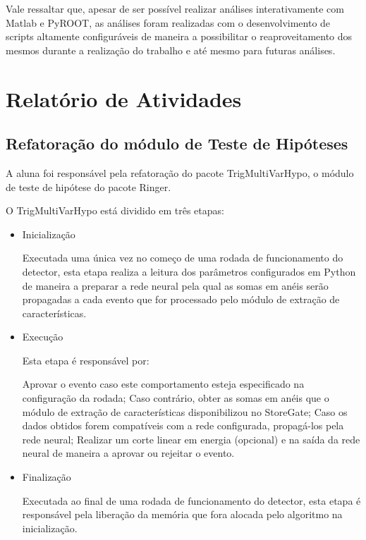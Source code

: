 \documentclass[a4paper,10pt,titlepage]{article}
\begin{document}
Vale ressaltar que, apesar de ser possível realizar análises interativamente com Matlab e PyROOT, as análises foram realizadas com o desenvolvimento de scripts altamente configuráveis de maneira a possibilitar o reaproveitamento dos mesmos durante a realização do trabalho e até mesmo para futuras análises.

\clearpage

\section{Relatório de Atividades}

\subsection{Refatoração do módulo de Teste de Hipóteses}

A aluna foi responsável pela refatoração do pacote TrigMultiVarHypo, o módulo de teste de hipótese do pacote Ringer.

O TrigMultiVarHypo está dividido em três etapas:

\begin{itemize}
 \item Inicialização

Executada uma única vez no começo de uma rodada de funcionamento do detector, esta etapa realiza a leitura dos parâmetros configurados em Python de maneira a preparar a rede neural pela qual as somas em anéis serão propagadas a cada evento que for processado pelo módulo de extração de características.

 \item Execução

Esta etapa é responsável por:

 \subitem Aprovar o evento caso este comportamento esteja especificado na configuração da rodada; 
 \subitem Caso contrário, obter as somas em anéis que o módulo de extração de características disponibilizou no StoreGate;
 \subitem Caso os dados obtidos forem compatíveis com a rede configurada, propagá-los pela rede neural;
 \subitem Realizar um corte linear em energia (opcional) e na saída da rede neural de maneira a aprovar ou rejeitar o evento.

 \item Finalização

Executada ao final de uma rodada de funcionamento do detector, esta etapa é responsável pela liberação da memória que fora alocada pelo algoritmo na inicialização.

\end{itemize}
\end{document}
